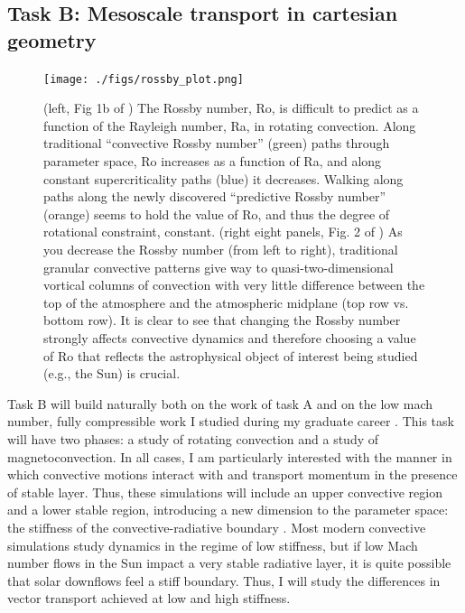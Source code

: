 \documentclass[aasms,12pt]{article}
\begin{document}
\subsection{Task B: Mesoscale transport in cartesian geometry}
\begin{figure}[t!]
    \texttt{[image: ./figs/rossby\_plot.png]}
    \caption{(left, Fig 1b of \citet{anders&all2019}) The Rossby number, Ro, is difficult to predict as a function of the Rayleigh number, Ra, in rotating convection.
	Along traditional ``convective Rossby number'' (green) paths through parameter space, Ro increases as a function of Ra, and along constant supercriticality paths (blue) it decreases.
	Walking along paths along the newly discovered ``predictive Rossby number'' (orange) seems to hold the value of Ro, and thus the degree of rotational constraint, constant.
	(right eight panels, Fig. 2 of \citet{anders&all2019}) As you decrease the Rossby number (from left to right), traditional granular convective patterns give way to quasi-two-dimensional vortical columns of convection with very little difference between the top of the atmosphere and the atmospheric midplane (top row vs. bottom row).
	It is clear to see that changing the Rossby number strongly affects convective dynamics and therefore choosing a value of Ro that reflects the astrophysical object of interest being studied (e.g., the Sun) is crucial.
	\label{fig:rossby_plot} }
\end{figure}


Task B will build naturally both on the work of task A and on the low mach number, fully compressible work I studied during my graduate career \citep{anders&brown2017, anders&all2019}.
This task will have two phases: a study of rotating convection and a study of magnetoconvection.
In all cases, I am particularly interested with the manner in which convective motions interact with and transport momentum in the presence of stable layer.
Thus, these simulations will include an upper convective region and a lower stable region, introducing a new dimension to the parameter space: the stiffness of the convective-radiative boundary \citep[or, whether or not convective motions can penetrate the stable region, as in][]{couston&all2017}.
Most modern convective simulations study dynamics in the regime of low stiffness, but if low Mach number flows in the Sun impact a very stable radiative layer, it is quite possible that solar downflows feel a stiff boundary.
Thus, I will study the differences in vector transport achieved at low and high stiffness.
\end{document}
